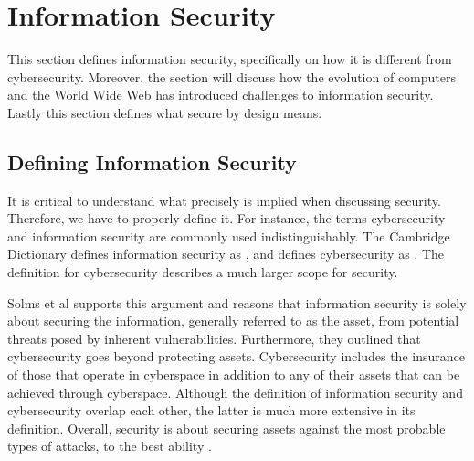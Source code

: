 \section{Information Security}
This section defines information security, specifically on how it is different from cybersecurity. Moreover, the section will discuss how the evolution of computers and the World Wide Web has introduced challenges to information security. Lastly this section defines what secure by design means.

\subsection{Defining Information Security}
It is critical to understand what precisely is implied when discussing security. Therefore, we have to properly define it. For instance, the terms cybersecurity and information security are commonly used indistinguishably. The Cambridge Dictionary defines information security as , and defines cybersecurity as . The definition for cybersecurity describes a much larger scope for security. 

Solms et al \cite{von_Solms_2013} supports this argument and reasons that information security is solely about securing the information, generally referred to as the asset, from potential threats posed by inherent vulnerabilities. Furthermore, they outlined that cybersecurity goes beyond protecting assets. Cybersecurity includes the insurance of those that operate in cyberspace in addition to any of their assets that can be achieved through cyberspace. Although the definition of information security and cybersecurity overlap each other, the latter is much more extensive in its definition. Overall, security is about securing assets against the most probable types of attacks, to the best ability \cite{andress2014the}.



